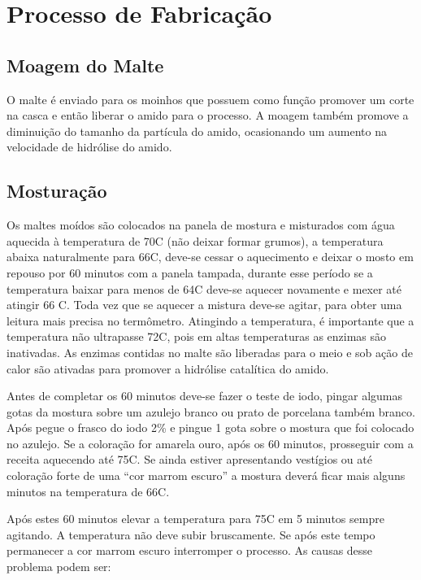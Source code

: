 \section{Processo de Fabricação}

\subsection{Moagem do Malte}

O malte é enviado para os moinhos que possuem como função promover um corte na casca e então liberar o amido para o processo. A moagem também promove a diminuição do tamanho da partícula do amido, ocasionando um aumento na velocidade de hidrólise do amido.

\subsection{Mosturação}
Os maltes moídos são colocados na panela de mostura e misturados com água aquecida à temperatura de 70\textdegree C (não deixar formar grumos), a temperatura abaixa naturalmente para 66\textdegree C, deve-se cessar o aquecimento e deixar o mosto em repouso por 60 minutos com a panela tampada, durante esse período se a temperatura baixar para menos de 64\textdegree C deve-se aquecer novamente e mexer até atingir 66 \textdegree C. Toda vez que se aquecer a mistura deve-se agitar, para obter uma leitura mais precisa no termômetro. Atingindo a temperatura, é importante que a temperatura não ultrapasse 72\textdegree C, pois em altas temperaturas as enzimas são inativadas. As enzimas contidas no malte são liberadas para o meio e sob ação de calor são ativadas para promover a hidrólise catalítica do amido.

Antes de completar os 60 minutos deve-se fazer o teste de iodo, pingar algumas gotas da mostura sobre um azulejo branco ou prato de porcelana também branco. Após pegue o frasco do iodo 2\% e pingue 1 gota sobre o mostura que foi colocado no azulejo. Se a coloração for amarela ouro, após os 60 minutos, prosseguir com a receita aquecendo até 75\textdegree C. Se ainda estiver apresentando vestígios ou até coloração forte de uma “cor marrom escuro” a mostura deverá ficar mais alguns minutos na temperatura de 66\textdegree C.

Após estes 60 minutos elevar a temperatura para 75\textdegree C em 5 minutos sempre agitando. A temperatura não deve subir bruscamente. Se após este tempo permanecer a cor marrom escuro interromper o processo. As causas desse problema podem ser:

